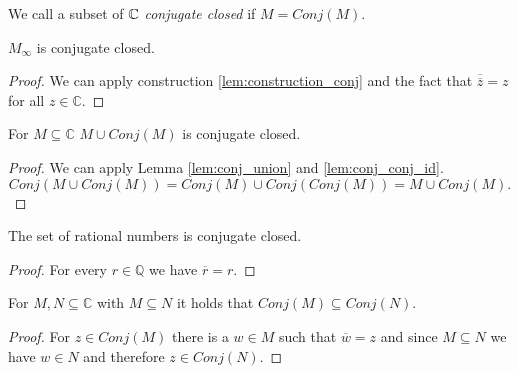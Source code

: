 \begin{definition}
    \label{def:conj_closed}
    \leanok
    We call a subset of $\mathbb{C}$ \emph{conjugate closed} if $M= Conj(M)$.
\end{definition}


\begin{lemma}
    \label{lem:conj_MField}
    \leanok
    $M_{\infty}$ is conjugate closed.
\end{lemma}
\begin{proof}
    We can apply construction \ref{lem:construction_conj} and the fact that $\overline{\overline z} = z$ for all $z \in\mathbb{C}$.
\end{proof}

\begin{lemma}
    \label{lem:M_con_M}
    \leanok
    For $M\subseteq \mathbb{C}$ $M\cup Conj(M)$ is conjugate closed.
\end{lemma}
\begin{proof}
    We can apply Lemma \ref{lem:conj_union} and \ref{lem:conj_conj_id}.
    $$Conj(M\cup Conj(M)) = Conj(M) \cup Conj(Conj(M)) = M \cup Conj(M).$$
\end{proof}

\begin{lemma}
    \label{lem:ConjClosed.Rat_ConjClosed}
    \leanok
    The set of rational numbers is conjugate closed.
\end{lemma}

\begin{proof}
    For every $r \in \mathbb{Q}$ we have $\overline{r} = r$.
\end{proof}

\begin{lemma}
    \label{lem:ConjClosed.conj_inclusion}
    \leanok
    For $M,N \subseteq \mathbb{C}$ with $M \subseteq N$ it holds that $Conj(M) \subseteq Conj(N)$.
\end{lemma}
\begin{proof}
    For $z \in Conj(M)$ there is a $w \in M$ such that $\overline{w} = z$ and since $M \subseteq N$ we have $w \in N$ and therefore $z \in Conj(N)$.
\end{proof}

